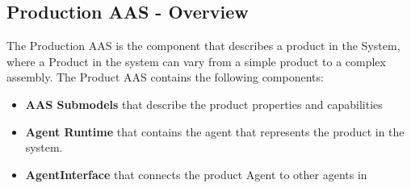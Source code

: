 \newpage
\subsection{Production AAS - Overview}

The Production AAS is the component that describes a product in the System,
where a Product in the system can vary from a simple product to a complex assembly.
The Product AAS contains the following components:
\begin{itemize}
    \item \textbf{AAS Submodels} that describe the product properties and capabilities
    \item \textbf{Agent Runtime} that contains the agent that represents the product in the system.
    \item \textbf{AgentInterface} that connects the product Agent to other agents in
\end{itemize}

